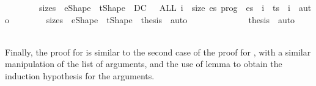 \documentclass{llncs}
\newenvironment{isacode}
{\begin{list}{}{
\setlength{\leftmargin}{4pt}
\setlength{\rightmargin}{0pt}
\setlength{\listparindent}{0pt}\raggedright
\setlength{\itemsep}{0pt}
\setlength{\parsep}{0pt}
\normalfont\ttfamily }\item[]}
{\end{list}}
\begin{document}
{\begin{isacode}
\ \ \ \ \ \ \ \isamarkupfalse \ size{\isacharprime}s\ \ e{\isacharprime}Shape\ \ t{\isacharprime}Shape\ \ DC\ {\isacharparenleft}{}{\isacharparenright}\ \isamarkupfalse \ {\isachardoublequoteopen}ALL\ i\ {\isacharless}\ {\isacharparenleft}size\ es{\isacharparenright}{\isachardot}\ prog\ {\isasymturnstile}\ {\isacharparenleft}es{\isacharprime}\ {\isacharbang}\ i{\isacharparenright}\ {\isasymrightarrow}\ {\isacharparenleft}ts{\isacharprime}\ {\isacharbang}\ i{\isacharparenright}{\isachardoublequoteclose}\ \isamarkupfalse \ auto\isanewline
\ \ \ \ \ \ \ \isamarkupfalse \ size{\isacharprime}s\ \ e{\isacharprime}Shape\ \ t{\isacharprime}Shape\ \isamarkupfalse \ {\isacharquery}thesis\ \isamarkupfalse \ auto\isanewline
\ \ \ \ \ \ \isacommand{{\isacharbraceright}}\isamarkupfalse \isanewline
\ \ \ \ \ \isamarkupfalse \ \isamarkupfalse \ {\isacharquery}thesis\ \isamarkupfalse \ auto\isanewline
\ \ \ \ \isamarkupfalse \isanewline
{}\isamarkupfalse \end{isacode}}{}
Finally, the proof for  is similar to the second case of
the proof for , with a similar manipulation of the list of
arguments, and the use of lemma  to obtain the
induction hypothesis for the arguments.
\end{document}

